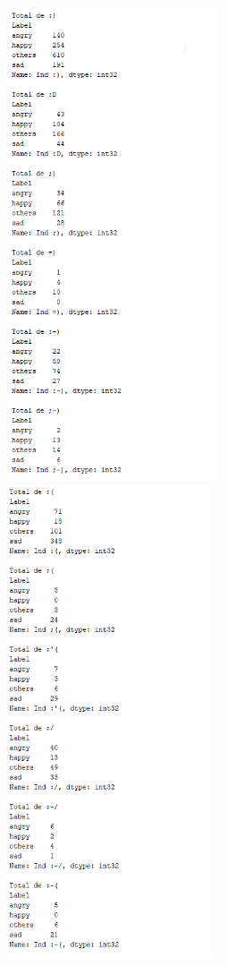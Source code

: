 \begin{figure}[h!] %
	\begin{minipage}[b]{0.3\textwidth}
		\includegraphics[width=\textwidth,height=14cm]{images/analyse_emojis_car_pos}
	\end{minipage}
	\hfill
	\begin{minipage}[b]{0.3\textwidth}
		\includegraphics[width=\textwidth,height=14cm]{images/analyse_emojis_car_neg}

\end{minipage}
\end{figure}
